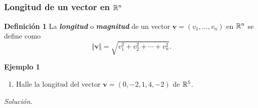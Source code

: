 
\subsection{}

\begin{frame}\frametitle{Longitud de un vector en $\mathbb{R}^n$}

\begin{defi}{\textbf{Definición 1}}\justifying
	La \textbf{\textit{longitud}} o \textbf{\textit{magnitud}} de un vector $\mathbf{v}=(v_1,\hdots,v_n)$ en $\mathbb{R}^n$ se define
	como
	\[
	\Vert \mathbf{v}\Vert = \sqrt{v_1^2+v_2^2+\cdots+v_n^2}.
	\]
\end{defi}	

\begin{ej}{\textbf{Ejemplo 1}}
	\begin{enumerate}\justifying
		\item[\labelname{$a$}] Halle la longitud del vector $\mathbf{v}=(0,-2,1,4,-2)$ de $\mathbb{R}^5$. 
	\end{enumerate}
\end{ej}
\textit{Solución}.

\end{frame}


\subsection{}

